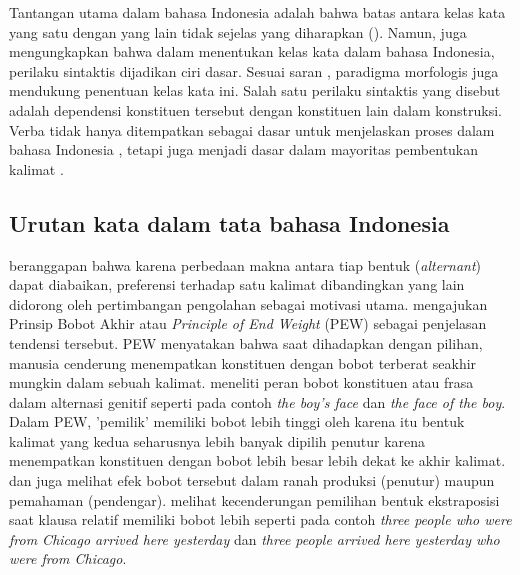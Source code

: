 Tantangan utama dalam bahasa Indonesia adalah bahwa batas antara kelas kata yang satu dengan yang lain tidak sejelas yang diharapkan (\citealp{kridalaksana2002struktur, achmad2013linguistik}). Namun, \cite{kridalaksana2002struktur} juga mengungkapkan bahwa dalam menentukan kelas kata dalam bahasa Indonesia, perilaku sintaktis dijadikan ciri dasar. Sesuai saran \cite{robins1985linguistics}, paradigma morfologis juga mendukung penentuan kelas kata ini. Salah satu perilaku sintaktis yang disebut \cite{kridalaksana2002struktur} adalah dependensi konstituen tersebut dengan konstituen lain dalam konstruksi. Verba tidak hanya ditempatkan sebagai dasar untuk menjelaskan proses dalam bahasa Indonesia \citep{demena2008bahasa}, tetapi juga menjadi dasar dalam mayoritas pembentukan kalimat \citep{kridalaksana1999deskriptif}.

\subsection{Urutan kata dalam tata bahasa Indonesia}
\cite{wasow2002postverbal} beranggapan bahwa karena perbedaan makna antara tiap bentuk (\textit{alternant}) dapat diabaikan, preferensi terhadap satu kalimat dibandingkan yang lain didorong oleh pertimbangan pengolahan sebagai motivasi utama. \cite{wasow2002postverbal} mengajukan Prinsip Bobot Akhir atau \textit{Principle of End Weight} (PEW) sebagai penjelasan tendensi tersebut. PEW menyatakan bahwa saat dihadapkan dengan pilihan, manusia cenderung menempatkan konstituen dengan bobot terberat seakhir mungkin dalam sebuah kalimat. \cite{rosenbach2005animacy} meneliti peran bobot konstituen atau frasa dalam alternasi genitif seperti pada contoh \textit{the boy's face} dan \textit{the face of the boy}. Dalam PEW, 'pemilik' memiliki bobot lebih tinggi oleh karena itu bentuk kalimat yang kedua seharusnya lebih banyak dipilih penutur karena menempatkan konstituen dengan bobot lebih besar lebih dekat ke akhir kalimat. \cite{francis2010grammatical} dan \cite{rosenbach2005animacy} juga melihat efek bobot tersebut dalam ranah produksi (penutur) maupun pemahaman (pendengar). \cite{francis2010grammatical} melihat kecenderungan pemilihan bentuk ekstraposisi saat klausa relatif memiliki bobot lebih seperti pada contoh \textit{three people who were from Chicago arrived here yesterday} dan \textit{three people arrived here yesterday who were from Chicago}.

